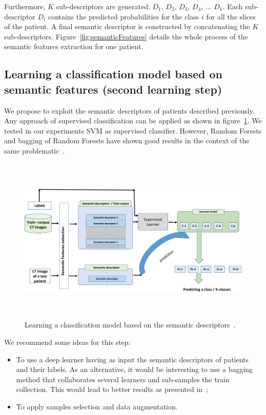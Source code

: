 \documentclass{llncs}
\begin{document}
Furthermore, $K$ sub-descriptors are generated: $D_1$, $D_2$, $D_3$, $D_4$, ... $D_k$. Each sub-descriptor $D_i$ contains the predicted probabilities for the class $i$ for all the slices of the patient. A final semantic descriptor is constructed by concatenating the $K$ sub-descriptors. Figure~\ref{fig:semanticFeatures} details the whole process of the semantic features extraction for one patient.




\subsection{Learning a classification model based on semantic features (second learning step)}
We propose to exploit the semantic descriptors of patients described previously. Any approach of supervised classification can be applied as shown in figure~\ref{fig:classification}. We tested in our experiments SVM as supervised classifier. However, Random Forests and bagging of Random Forests have shown good results in the context of the same problematic~\cite{HamadiY18}.\\

\begin{figure}[!ht]
\center
\includegraphics[width=\textwidth,height=8cm]{classification.pdf}
\caption{Learning a classification model based on the semantic descriptors~\cite{HamadiY18}.} 
\label{fig:classification}
\end{figure}

We recommend some ideas for this step:
\begin{itemize}
\item To use a deep learner having as input the semantic descriptors of patients and their labels. As an alternative, it would be interesting to use a bagging method that collaborates several learners and sub-samples the train collection. This would lead to better results as presented in~\cite{HamadiY18};
\item To apply samples selection and data augmentation.
\end{itemize}
\end{document}
